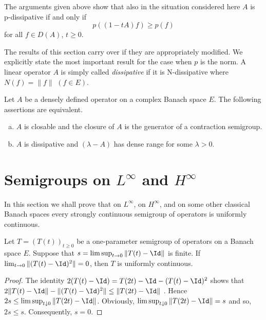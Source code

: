 The arguments given above show that also in the situation considered here $A$ is p-dissipative if and only if
\[
    p((1-tA)f) \geq p(f)
\]
for all $f \in D(A)$, $t \geq 0$.

The results of this section carry over if they are appropriately modified.
We explicitly state the most important result for the case when $p$ is the norm.
A linear operator $A$ is simply called \emph{dissipative} if it is N-dissipative where $N(f) = \|f\|$ $(f \in E)$.

\begin{theorem}\label{thm:a2-2.13}
Let $A$ be a densely defined operator on a complex Banach space $E$.
The following assertions are equivalent.
\begin{enumerate}[(a)]	
\item \label{thm:a2-2.13.1}
$A$ is closable and the closure of $A$ is the generator of a contraction semigroup.
\item \label{thm:a2-2.13.2}
$A$ is dissipative and $(\lambda - A)$ has dense range for some $\lambda > 0$.
\end{enumerate}
\end{theorem}
\newcommand*{\inftyoo}{oo }
\section{Semigroups on $L^{\infty}$  and $H^{\infty}$ \label{sec:a2-3}}
In this section we shall prove that on $L^\infty$, on $H^\infty$, and on some other classical Banach spaces every strongly continuous semigroup of operators is uniformly continuous.
\begin{lemma}\label{lem:a2-3.1}
Let $T = (T(t))_{t\geq 0}$ be a one-parameter semigroup of operators on a Banach space $E$.
Suppose that $s = \lim\sup_{t\to 0} \|T(t) - \Id\|$ is finite.
If $\lim_{t\to 0} \|(T(t) - \Id)^2\| = 0$, then $T$ is uniformly continuous.
\end{lemma}

\begin{proof}
The identity $2(T(t) - \Id) = T(2t) - \Id - (T(t) - \Id)^2$ shows
that $2\|T(t) - \Id\| - \|(T(t) - \Id)^{2} \| \leq \|T(2t) - \Id\|$ .
Hence $2s \leq \lim \sup_{t \downarrow 0} \|T(2t) - \Id\|$.
Obviously, $\lim \sup_{t \downarrow 0} \|T(2t) - \Id\| = s$ and so, $2s \leq s$.
Consequently, $s = 0$.
\end{proof}


